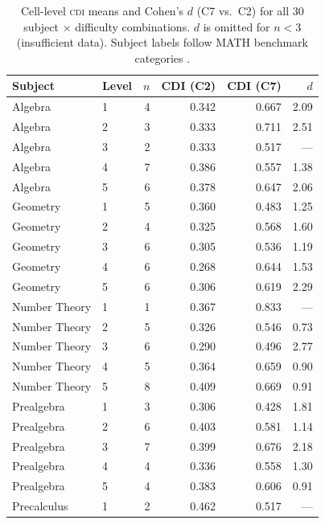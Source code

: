 \documentclass{article}
\newcommand{\CDI}{\textsc{cdi}}
\begin{document}
\begin{table}[h]
  \caption{Cell-level \CDI{} means and Cohen's $d$ (C7 vs.\ C2) for
  all 30 subject $\times$ difficulty combinations. $d$ is omitted for
  $n < 3$ (insufficient data). Subject labels follow MATH benchmark
  categories \citep{hendrycks2021math}.}
  \label{tab:heatmap}
  \centering
  \small
  \begin{tabular}{llrrrr}
    \toprule
    \textbf{Subject} & \textbf{Level} & \textbf{$n$} &
    \textbf{CDI (C2)} & \textbf{CDI (C7)} & \textbf{$d$} \\
    \midrule
    Algebra         & 1 &  4 & 0.342 & 0.667 & 2.09 \\
    Algebra         & 2 &  3 & 0.333 & 0.711 & 2.51 \\
    Algebra         & 3 &  2 & 0.333 & 0.517 & --- \\
    Algebra         & 4 &  7 & 0.386 & 0.557 & 1.38 \\
    Algebra         & 5 &  6 & 0.378 & 0.647 & 2.06 \\
    \midrule
    Geometry        & 1 &  5 & 0.360 & 0.483 & 1.25 \\
    Geometry        & 2 &  4 & 0.325 & 0.568 & 1.60 \\
    Geometry        & 3 &  6 & 0.305 & 0.536 & 1.19 \\
    Geometry        & 4 &  6 & 0.268 & 0.644 & 1.53 \\
    Geometry        & 5 &  6 & 0.306 & 0.619 & 2.29 \\
    \midrule
    Number Theory   & 1 &  1 & 0.367 & 0.833 & --- \\
    Number Theory   & 2 &  5 & 0.326 & 0.546 & 0.73 \\
    Number Theory   & 3 &  6 & 0.290 & 0.496 & 2.77 \\
    Number Theory   & 4 &  5 & 0.364 & 0.659 & 0.90 \\
    Number Theory   & 5 &  8 & 0.409 & 0.669 & 0.91 \\
    \midrule
    Prealgebra      & 1 &  3 & 0.306 & 0.428 & 1.81 \\
    Prealgebra      & 2 &  6 & 0.403 & 0.581 & 1.14 \\
    Prealgebra      & 3 &  7 & 0.399 & 0.676 & 2.18 \\
    Prealgebra      & 4 &  4 & 0.336 & 0.558 & 1.30 \\
    Prealgebra      & 5 &  4 & 0.383 & 0.606 & 0.91 \\
    \midrule
    Precalculus     & 1 &  2 & 0.462 & 0.517 & --- \\

\end{tabular}
\end{table}
\end{document}
